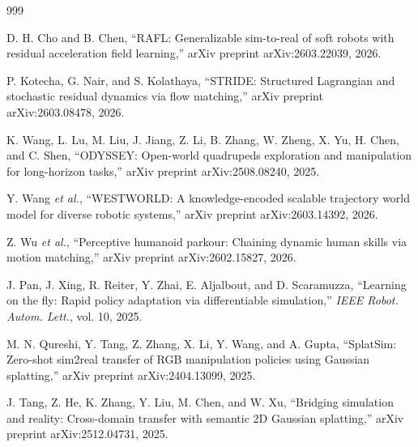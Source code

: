 \documentclass[12pt,a4paper,oneside]{report}
\begin{document}
\begin{thebibliography}{999}

D. H. Cho and B. Chen, ``{RAFL}: Generalizable sim-to-real of soft robots with residual acceleration field learning,'' arXiv preprint arXiv:2603.22039, 2026.




P. Kotecha, G. Nair, and S. Kolathaya, ``{STRIDE}: Structured Lagrangian and stochastic residual dynamics via flow matching,'' arXiv preprint arXiv:2603.08478, 2026.




K. Wang, L. Lu, M. Liu, J. Jiang, Z. Li, B. Zhang, W. Zheng, X. Yu, H. Chen, and C. Shen, ``{ODYSSEY}: Open-world quadrupeds exploration and manipulation for long-horizon tasks,'' arXiv preprint arXiv:2508.08240, 2025.




Y. Wang \textit{et al.}, ``{WESTWORLD}: A knowledge-encoded scalable trajectory world model for diverse robotic systems,'' arXiv preprint arXiv:2603.14392, 2026.




Z. Wu \textit{et al.}, ``Perceptive humanoid parkour: Chaining dynamic human skills via motion matching,'' arXiv preprint arXiv:2602.15827, 2026.




J. Pan, J. Xing, R. Reiter, Y. Zhai, E. Aljalbout, and D. Scaramuzza, ``Learning on the fly: Rapid policy adaptation via differentiable simulation,'' \textit{IEEE Robot. Autom. Lett.}, vol. 10, 2025.




M. N. Qureshi, Y. Tang, Z. Zhang, X. Li, Y. Wang, and A. Gupta, ``{SplatSim}: Zero-shot sim2real transfer of {RGB} manipulation policies using Gaussian splatting,'' arXiv preprint arXiv:2404.13099, 2025.




J. Tang, Z. He, K. Zhang, Y. Liu, M. Chen, and W. Xu, ``Bridging simulation and reality: Cross-domain transfer with semantic 2D Gaussian splatting,'' arXiv preprint arXiv:2512.04731, 2025.




\end{thebibliography}
\end{document}
